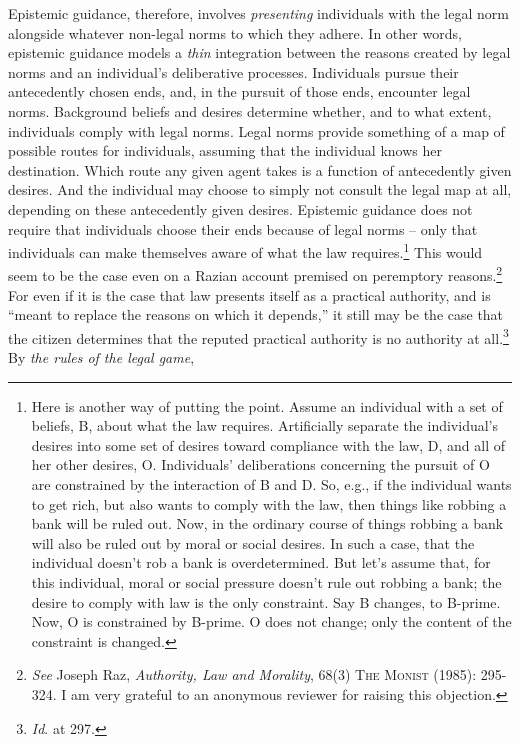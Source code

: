 Epistemic guidance, therefore, involves \emph{presenting} individuals
with the legal norm alongside whatever non-legal norms to which they
adhere. In other words, epistemic guidance models a \emph{thin}
integration between the reasons created by legal norms and an
individual's deliberative processes. Individuals pursue their
antecedently chosen ends, and, in the pursuit of those ends, encounter
legal norms. Background beliefs and desires determine whether, and to
what extent, individuals comply with legal norms. Legal norms provide
something of a map of possible routes for individuals, assuming that the
individual knows her destination. Which route any given agent takes is a
function of antecedently given desires. And the individual may choose to
simply not consult the legal map at all, depending on these antecedently
given desires. Epistemic guidance does not require that individuals
choose their ends because of legal norms -- only that individuals can
make themselves aware of what the law requires.\footnote{Here is another
  way of putting the point. Assume an individual with a set of beliefs,
  B, about what the law requires. Artificially separate the individual's
  desires into some set of desires toward compliance with the law, D,
  and all of her other desires, O. Individuals' deliberations concerning
  the pursuit of O are constrained by the interaction of B and D. So,
  e.g., if the individual wants to get rich, but also wants to comply
  with the law, then things like robbing a bank will be ruled out. Now,
  in the ordinary course of things robbing a bank will also be ruled out
  by moral or social desires. In such a case, that the individual
  doesn't rob a bank is overdetermined. But let's assume that, for this
  individual, moral or social pressure doesn't rule out robbing a bank;
  the desire to comply with law is the only constraint. Say B changes,
  to B-prime. Now, O is constrained by B-prime. O does not change; only
  the content of the constraint is changed.} This would seem to be the
case even on a Razian account premised on peremptory reasons.\footnote{\emph{See}
  Joseph Raz, \emph{Authority, Law and Morality}, 68(3) \textsc{The
  Monist} (1985): 295-324. I am very grateful to an anonymous reviewer
  for raising this objection.} For even if it is the case that law
presents itself as a practical authority, and is ``meant to replace the
reasons on which it depends,'' it still may be the case that the citizen
determines that the reputed practical authority is no authority at
all.\footnote{\emph{Id}. at 297.} By \emph{the rules of the legal game},
